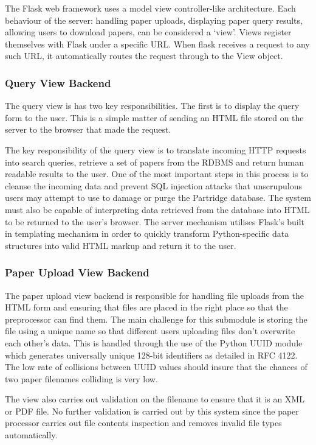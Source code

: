 The Flask web framework uses a model view controller-like architecture. Each
behaviour of the server: handling paper uploads, displaying paper query
results, allowing users to download papers, can be considered a `view'. Views
register themselves with Flask under a specific URL. When flask receives a
request to any such URL, it automatically routes the request through to the
View object\cite{flask2012}.

\subsubsection{Query View Backend}
The query view is has two key responsibilities. The first is to display the
query form to the user. This is a simple matter of sending an HTML file stored
on the server to the browser that made the request. 

The key responsibility of the query view is to translate incoming HTTP requests
into search queries, retrieve a set of papers from the RDBMS  and return human
readable results to the user. One of the most important steps in this process
is to cleanse the incoming data and prevent SQL injection attacks that
unscrupulous users may attempt to use to damage or purge the Partridge
database. The system must also be capable of interpreting data retrieved from
the database into HTML to be returned to the user's browser. The server
mechanism utilises Flask's built in templating mechanism in order to quickly
transform Python-specific data structures into valid HTML markup and return it
to the user\cite{flask2012}.

\subsubsection{Paper Upload View Backend}

The paper upload view backend is responsible for handling file uploads from the
HTML form and ensuring that files are placed in the right place so that the
preprocessor can find them. The main challenge for this submodule is storing
the file using a unique name so that different users uploading files don't
overwrite each other's data. This is handled through the use of the Python UUID
module which generates universally unique 128-bit identifiers as detailed in RFC
4122\cite{rfc4122}. The low rate of collisions between UUID values should
insure that the chances of two paper filenames colliding is very low. 

The view also carries out validation on the filename to ensure that it is an
XML or PDF file. No further validation is carried out by this system since the
paper processor carries out file contents inspection and removes invalid file
types automatically.


